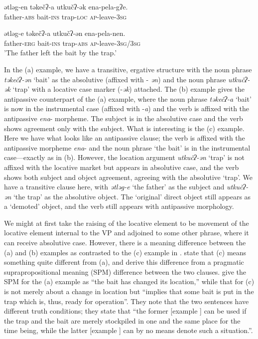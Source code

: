 \documentclass[output=paper,colorlinks,citecolor=brown,nonflat]{./langscibook}
\begin{document}
    \ex \label{ex:basilico:11b}
    \gll ətləg-en   təkečʔ-a   utkučʔ-ək   ena-pela-gʔe.\\
    father-\textsc{{abs}}  bait-\textsc{ins}  trap-\textsc{loc}  \textsc{ap}{}-leave-3\textsc{sg}\\
    \glt 
    
    \ex \label{ex:basilico:11c}
    \gll ətləg-e  təkečʔ-a  utkučʔ-ən  ena-pela-nen.\\
    father-\textsc{{erg}}  bait-\textsc{ins}  trap-\textsc{{abs}}  \textsc{ap}{}-leave-3\textsc{sg}/3\textsc{sg}\\
    \glt 'The father left the bait by the trap.'
    \z
    \z


In the (a) example, we have a transitive, ergative structure with the noun phrase \textit{təkečʔ-ən} ‘bait’ as the absolutive (affixed with - \textit{ən}) and the noun phrase \textit{utkučʔ-ək} ‘trap’ with a locative case marker (-\textit{ək}) attached. The (b) example gives the antipassive counterpart of the (a) example, where the noun phrase \textit{təkečʔ-a} ‘bait’ is now in the instrumental case (affixed with -\textit{a}) and the verb is affixed with the antipassive \textit{ena}{}- morpheme. The subject is in the absolutive case and the verb shows agreement only with the subject. What is interesting is the (c) example. Here we have what looks like an antipassive clause; the verb is affixed with the antipassive morpheme \textit{ena}{}- and the noun phrase ‘the bait’ is in the instrumental case—exactly as in (b). However, the location argument \textit{utkučʔ-ən} ‘trap’ is not affixed with the locative market but appears in absolutive case, and the verb shows both subject and object agreement, agreeing with the absolutive ‘trap’. We have a transitive clause here, with \textit{ətləg-e} ‘the father’ as the subject and \textit{utkučʔ-ən} ‘the trap’ as the absolutive object. The ‘original’ direct object still appears as a ‘demoted’ object, and the verb still appears with antipassive morphology. 

We might at first take the raising of the locative element to be movement of the locative element internal to the VP and adjoined to some other phrase, where it can receive absolutive case. However, there is a meaning difference between the (a) and (b) examples as contrasted to the (c) example in . \citet{KozinskyNedjalkovPolinskaja1988} state that (c) means something quite different from (a), and derive this difference from a pragmatic suprapropositional meaning (SPM) difference between the two clauses. \citet[684]{KozinskyNedjalkovPolinskaja1988} give the SPM for the (a) example as “the bait has changed its location,” while that for (c) is not merely about a change in location but “implies that some bait is put in the trap which is, thus, ready for operation”. They note that the two sentences have different truth conditions; they state that “the former [example ] can be used if the trap and the bait are merely stockpiled in one and the same place for the time being, while the latter [example ] can by no means denote such a situation.”. 
\end{document}
